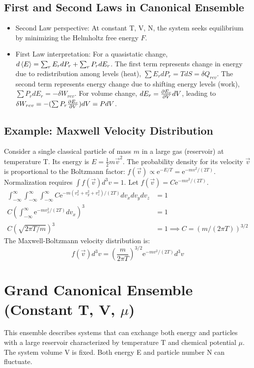 \documentclass[10pt, letterpaper]{article}
\newcommand{\avg}[1]{\expval{#1}} %
\newcommand{\mathe}{\mathrm{e}} %
\begin{document}
\subsection{First and Second Laws in Canonical Ensemble}
\begin{itemize}
    \item Second Law perspective: At constant T, V, N, the system seeks equilibrium by minimizing the Helmholtz free energy $F$.
    \item First Law interpretation: For a quasistatic change, $d\avg{E} = \sum_r E_r dP_r + \sum_r P_r dE_r$. The first term represents change in energy due to redistribution among levels (heat), $\sum E_r dP_r = T dS = \delta Q_{rev}$. The second term represents energy change due to shifting energy levels (work), $\sum P_r dE_r = -\delta W_{rev}$. For volume change, $dE_r = \pdv{E_r}{V} dV$, leading to $\delta W_{rev} = - (\sum P_r \pdv{E_r}{V}) dV = P dV$.
\end{itemize}

\subsection{Example: Maxwell Velocity Distribution}
Consider a single classical particle of mass $m$ in a large gas (reservoir) at temperature T. Its energy is $E = \frac{1}{2} m \vec{v}^2$.
The probability density for its velocity $\vec{v}$ is proportional to the Boltzmann factor: $f(\vec{v}) \propto \mathe^{-E/T} = \mathe^{-m v^2 / (2T)}$.
Normalization requires $\int f(\vec{v}) d^3v = 1$. Let $f(\vec{v}) = C \mathe^{-m v^2 / (2T)}$.
\begin{align*}
 \int_{-\infty}^\infty \int_{-\infty}^\infty \int_{-\infty}^\infty C \mathe^{-m (v_x^2+v_y^2+v_z^2) / (2T)} dv_x dv_y dv_z &= 1 \\
 C \left( \int_{-\infty}^\infty \mathe^{-m v_x^2 / (2T)} dv_x \right)^3 &= 1 \\
 C (\sqrt{2\pi T/m})^3 &= 1 \implies C = (m / (2\pi T))^{3/2}
\end{align*}
The Maxwell-Boltzmann velocity distribution is:
\begin{equation}
    f(\vec{v}) d^3v = \left( \frac{m}{2 \pi T} \right)^{3/2} \mathe^{-m v^2 / (2T)} d^3v
\end{equation}

\section{Grand Canonical Ensemble (Constant T, V, $\mu$)}
This ensemble describes systems that can exchange both energy and particles with a large reservoir characterized by temperature T and chemical potential $\mu$. The system volume V is fixed. Both energy E and particle number N can fluctuate.
\end{document}
